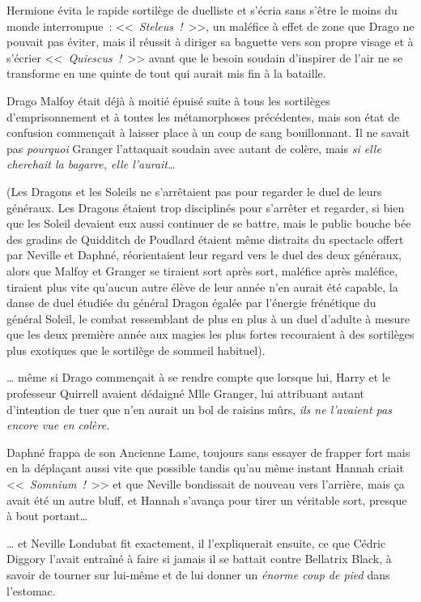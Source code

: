 Hermione évita le rapide sortilège de duelliste et s'écria sans s'être le moins du monde interrompue~: <<~\emph{Steleus~!}~>>, un maléfice à effet de zone que Drago ne pouvait pas éviter, mais il réussit à diriger sa baguette vers son propre visage et à s'écrier <<~\emph{Quiescus~!}~>> avant que le besoin soudain d'inspirer de l'air ne se transforme en une quinte de tout qui aurait mis fin à la bataille.

Drago Malfoy était déjà à moitié épuisé suite à tous les sortilèges d'emprisonnement et à toutes les métamorphoses précédentes, mais son état de confusion commençait à laisser place à un coup de sang bouillonnant. Il ne savait pas \emph{pourquoi} Granger l'attaquait soudain avec autant de colère, mais \emph{si elle cherchait la bagarre, elle l'aurait…}

(Les Dragons et les Soleils ne s'arrêtaient pas pour regarder le duel de leurs généraux. Les Dragons étaient trop disciplinés pour s'arrêter et regarder, si bien que les Soleil devaient eux aussi continuer de se battre, mais le public bouche bée des gradins de Quidditch de Poudlard étaient même distraits du spectacle offert par Neville et Daphné, réorientaient leur regard vers le duel des deux généraux, alors que Malfoy et Granger se tiraient sort après sort, maléfice après maléfice, tiraient plus vite qu'aucun autre élève de leur année n'en aurait été capable, la danse de duel étudiée du général Dragon égalée par l'énergie frénétique du général Soleil, le combat ressemblant de plus en plus à un duel d'adulte à mesure que les deux première année aux magies les plus fortes recouraient à des sortilèges plus exotiques que le sortilège de sommeil habituel).

… même si Drago commençait à se rendre compte que lorsque lui, Harry et le professeur Quirrell avaient dédaigné Mlle Granger, lui attribuant autant d'intention de tuer que n'en aurait un bol de raisins mûrs, \emph{ils ne l'avaient pas encore vue en colère.}

\later

Daphné frappa de son Ancienne Lame, toujours sans essayer de frapper fort mais en la déplaçant aussi vite que possible tandis qu'au même instant Hannah criait <<~\emph{Somnium~!}~>> et que Neville bondissait de nouveau vers l'arrière, mais ça avait été un autre bluff, et Hannah s'avança pour tirer un véritable sort, presque à bout portant…

… et Neville Londubat fit exactement, il l'expliquerait ensuite, ce que Cédric Diggory l'avait entraîné à faire si jamais il se battait contre Bellatrix Black, à savoir de tourner sur lui-même et de lui donner un \emph{énorme coup de pied} dans l'estomac.

